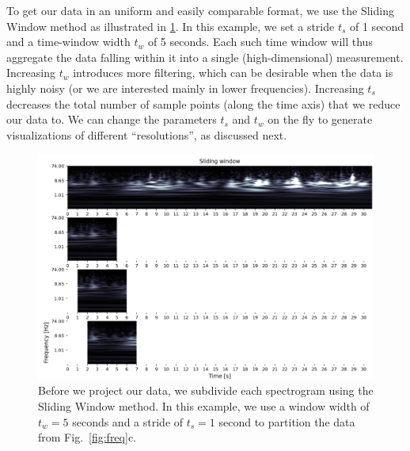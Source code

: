 To get our data in an uniform and easily comparable format, we use the Sliding Window method as illustrated in \cref{fig:sliding}. In this example, we set a stride $t_s$ of 1 second and a time-window width $t_w$ of 5 seconds. Each such time window will thus aggregate the data falling within it into a single (high-dimensional) measurement. Increasing $t_w$ introduces more filtering, which can be desirable when the data is highly noisy (or we are interested mainly in lower frequencies). Increasing $t_s$ decreases the total number of sample points (along the time axis) that we reduce our data to.
We can change the parameters $t_s$ and $t_w$ on the fly to generate visualizations of different ``resolutions'', as discussed next.

\begin{figure}[ht]
\centering
\includegraphics[width=\linewidth]{figures/nemo/sliding.png}
\caption{Before we project our data, we subdivide each spectrogram using the Sliding Window method. In this example, we use a window width of $t_w=5$ seconds and a stride of $t_s=1$ second to partition the data from Fig.~\ref{fig:freq}c.}
\label{fig:sliding}
\end{figure}

